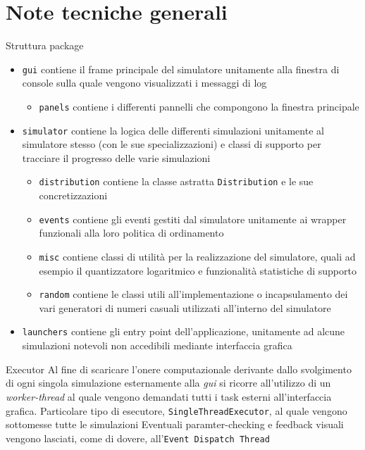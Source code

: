 \documentclass[slidestop,compress,mathserif]{beamer}
\begin{document}
\section{Note tecniche generali}
\begin{frame}{Struttura package}
\begin{itemize}
\scriptsize
\item[\textbullet] {\tt gui} \scriptsize{contiene il frame principale del simulatore unitamente alla finestra di console sulla quale vengono visualizzati i messaggi di log}
	\begin{itemize}
	\scriptsize
		\item[\textbullet] {\tt panels} \scriptsize{contiene i differenti pannelli che compongono la finestra principale}
	\end{itemize}
\item[\textbullet] {\tt simulator} \scriptsize{contiene la logica delle differenti simulazioni unitamente al simulatore stesso (con le sue specializzazioni) e classi di supporto per tracciare il progresso delle varie simulazioni}
	\begin{itemize}
	\scriptsize
		\item[\textbullet] {\tt distribution} \scriptsize{contiene la classe astratta {\tt Distribution} e le sue concretizzazioni}
		\item[\textbullet] {\tt events} \scriptsize{contiene gli eventi gestiti dal simulatore unitamente ai wrapper funzionali alla loro politica di ordinamento}
		\item[\textbullet] {\tt misc} \scriptsize{contiene classi di utilit\`a per la realizzazione del simulatore, quali ad esempio il quantizzatore logaritmico e funzionalit\`a statistiche di supporto}
		\item[\textbullet] {\tt random} \scriptsize{contiene le classi utili all'implementazione o incapsulamento dei vari generatori di numeri casuali utilizzati all'interno del simulatore}
	\end{itemize}
\item[\textbullet] {\tt launchers} \scriptsize{contiene gli entry point dell'applicazione, unitamente ad alcune simulazioni notevoli non accedibili mediante interfaccia grafica}
\end{itemize}
\end{frame}

\begin{frame}{Executor}
\vfill
Al fine di scaricare l'onere computazionale derivante dallo svolgimento di ogni singola simulazione esternamente alla \emph{gui} si ricorre all'utilizzo di un \emph{worker-thread} al quale vengono demandati tutti i task esterni all'interfaccia grafica.
\vfill
Particolare tipo di esecutore, {\tt SingleThreadExecutor}, al quale vengono sottomesse tutte le simulazioni
\vfill
Eventuali paramter-checking e feedback visuali vengono lasciati, come di dovere, all'{\tt Event Dispatch Thread}
\vfill
\end{frame}
\end{document}
